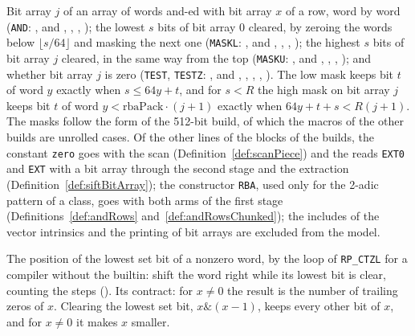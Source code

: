 \begin{definition}\label{def:bitArrayOps}
  \leanok
  Bit array $j$ of an array of words and-ed with bit array $x$ of a row, word by word (\verb|AND|:
  , and ,
  , ,
  ); the lowest $s$ bits of bit array $0$ cleared, by zeroing the
  words below $\lfloor s/64 \rfloor$ and masking the next one (\verb|MASKL|:
  , and ,
  , ,
  ); the highest $s$ bits of bit array $j$ cleared, in the same way
  from the top (\verb|MASKU|: , and
  , ,
  , ); and whether bit array $j$ is
  zero (\verb|TEST|, \verb|TESTZ|: , and
  , ,
  , ,
  ). The low mask keeps bit $t$ of word $y$ exactly when
  $s \le 64 y + t$, and for $s < R$ the high mask on bit array $j$ keeps bit $t$ of word
  $y < \mathrm{rbaPack} \cdot (j + 1)$ exactly when $64 y + t + s < R (j + 1)$. The masks follow the
  form of the 512-bit build, of which the macros of the other builds are unrolled cases. Of the
  other lines of the blocks of the builds, the constant \verb|zero| goes with the scan
  (Definition~\ref{def:scanPiece}) and the reads \verb|EXT0| and \verb|EXT| with a bit array through
  the second stage and the extraction (Definition~\ref{def:siftBitArray}); the constructor
  \verb|RBA|, used only for the 2-adic pattern of a class, goes with both arms of the first stage
  (Definitions~\ref{def:andRows} and~\ref{def:andRowsChunked}); the includes of the vector
  intrinsics and the printing of bit arrays are excluded from the model.
\end{definition}

\begin{definition}\label{def:ctz}
  \leanok
  The position of the lowest set bit of a nonzero word, by the loop of \verb|RP_CTZL| for a
  compiler without the builtin: shift the word right while its lowest bit is clear, counting the
  steps (). Its contract: for $x \ne 0$ the result is the number
  of trailing zeros of $x$. Clearing the lowest set bit, $x \mathbin{\&} (x - 1)$, keeps every
  other bit of $x$, and for $x \ne 0$ it makes $x$ smaller.
\end{definition}

